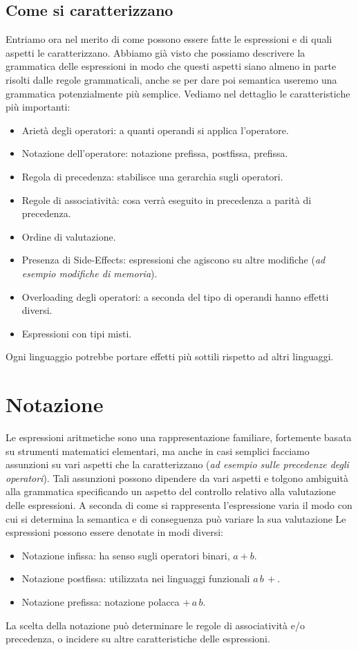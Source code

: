 \documentclass[oneside,a4paper,11pt]{book}
\theoremstyle{italicstyle}
\theoremstyle{normStyle}
\begin{document}
\subsection{Come si caratterizzano}
Entriamo ora nel merito di come possono essere fatte le espressioni
e di quali aspetti le caratterizzano.  Abbiamo già visto che possiamo
descrivere la grammatica delle espressioni in modo che questi aspetti
siano almeno in parte risolti dalle regole grammaticali, anche se per
dare poi semantica useremo una grammatica potenzialmente più semplice.
Vediamo nel dettaglio le caratteristiche  più importanti: 
\begin{itemize}
  \item Arietà degli operatori: a quanti operandi si applica l'operatore.
  \item Notazione dell'operatore: notazione prefissa, postfissa, prefissa.
  \item Regola di precedenza: stabilisce una gerarchia sugli operatori.
  \item Regole di associatività: cosa verrà eseguito in precedenza a parità di precedenza.
  \item Ordine di valutazione.
  \item Presenza di Side-Effects: espressioni che agiscono su altre modifiche
  (\textit{ad esempio modifiche di memoria}).
  \item Overloading degli operatori: a seconda del tipo di operandi hanno effetti 
  diversi.
  \item Espressioni con tipi misti.
\end{itemize}
Ogni linguaggio potrebbe portare effetti più sottili rispetto ad altri linguaggi.
\section{Notazione}
Le espressioni aritmetiche sono una rappresentazione familiare,
fortemente basata su strumenti matematici elementari, ma anche in casi semplici
facciamo assunzioni su vari aspetti che la caratterizzano
(\textit{ad esempio sulle precedenze degli operatori}). Tali
assunzioni possono dipendere da vari aspetti e tolgono ambiguità
alla grammatica specificando un aspetto del controllo relativo alla
valutazione delle espressioni. A seconda di come si rappresenta
l’espressione varia il modo con cui si determina la semantica e di
conseguenza può variare la sua valutazione Le espressioni possono
essere denotate in modi diversi: 
\begin{itemize}
  \item Notazione infissa: ha senso sugli operatori binari, $a + b$.
  \item Notazione postfissa: utilizzata nei linguaggi funzionali $ a \, b\,+$.
  \item Notazione prefissa: notazione polacca $+\, a \, b$.
\end{itemize}
La scelta della notazione può determinare le regole di associatività e/o
precedenza, o incidere su altre caratteristiche delle espressioni. 
\end{document}
